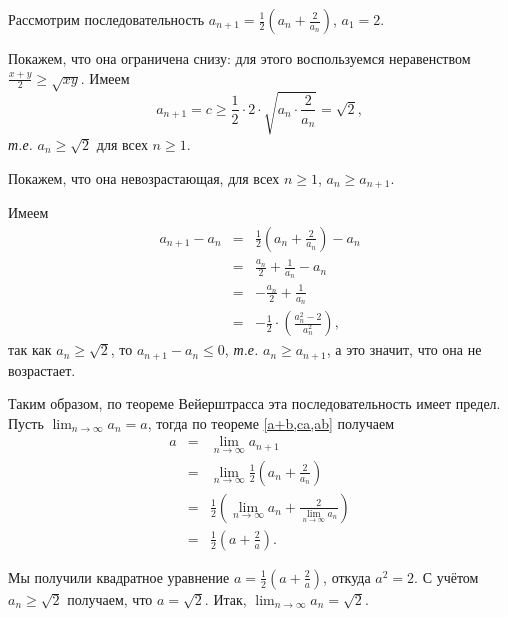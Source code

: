 \begin{example}
    Рассмотрим последовательность $a_{n+1} = \frac{1}{2}\left(a_n + \frac{2}{a_n} \right)$, $a_1 = 2$. 

    Покажем, что она ограничена снизу: для этого воспользуемся неравенством $\frac{x+y}{2} \ge \sqrt{xy}$. Имеем
    \[
     a_{n+1} = c \ge \frac{1}{2}\cdot 2 \cdot \sqrt{a_n \cdot \frac{2}{a_n}} = \sqrt{2},
    \]
\textit{т.е.} $a_n \ge \sqrt{2}$ для всех $n \ge 1$.

Покажем, что она невозрастающая, \ie для всех $n\ge 1$, $a_{n} \ge a_{n+1}$.

Имеем
 \begin{eqnarray*}
     a_{n+1} - a_n &=& \frac{1}{2}\left(a_n + \frac{2}{a_n} \right) - a_n \\
     &= & \frac{a_n}{2} + \frac{1}{a_n} - a_n \\
     &=& -\frac{a_n}{2} + \frac{1}{a_n} \\
     &=& -\frac{1}{2}\cdot\left( \frac{a_n^2 - 2}{a_n^2}\right),
 \end{eqnarray*}
так как $a_n \ge \sqrt{2}$, то $a_{n+1} - a_n \le 0$, \textit{т.е.} $a_{n} \ge a_{n+1}$, а это значит, что она не возрастает. 

   Таким образом, по теореме Вейерштрасса эта последовательность имеет предел. Пусть $\lim_{n\to \infty}a_n =a$, тогда по теореме \ref{a+b,ca,ab} получаем
    \begin{eqnarray*}
        a &=& \lim_{n \to \infty}a_{n+1} \\
        &=&\lim_{n \to \infty} \frac{1}{2} \left(a_n+ \frac{2}{a_n} \right) \\
        &=&  \frac{1}{2}\left( \lim_{n \to \infty} a_n + \frac{2}{\lim_{n \to \infty} a_n} \right) \\
        &=&\frac{1}{2}\left( a + \frac{2}{a}\right).
    \end{eqnarray*}

Мы получили квадратное уравнение $a = \frac{1}{2}\left(a + \frac{2}{a} \right)$, откуда $a^2 = 2$. С учётом $a_n \ge \sqrt{2}$ получаем, что $a = \sqrt{2}$. Итак, $\lim_{n \to \infty}a_n = \sqrt{2}.$
\end{example}



